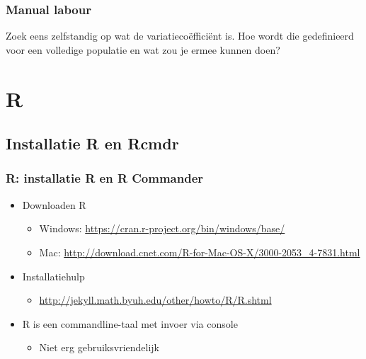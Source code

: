 \documentclass{beamer}
\newif\ifoplossing
\begin{document}
\begin{frame}
	\frametitle{Manual labour}
	Zoek eens zelfstandig op wat de variatieco\"effici\"ent is. Hoe
	wordt die gedefinieerd voor een volledige populatie en wat zou
	je ermee kunnen doen?
\end{frame}

\ifoplossing
	\begin{frame}
		De co\"effici\"nt van variatie is de standaard afwijking gedeeld door het gemiddelde.
		\[ c_{v} = \frac{\sigma}{\mu} \] 
		De variatiecoëfficiënt is dimensieloos en kan dus goed gebruikt worden om verschillende 
		populaties te vergelijken, zeker wanneer deze populaties sterk uiteenlopende gemiddelden hebben. 
		De variatiecoëfficiënt is in feite een maat voor relatieve spreiding: hij meet de mate van spreiding, 
		via de standaardafwijking, maar relatief ten opzichte van de gemiddelde ligging van de waarden.
	\end{frame}

\fi

\section{R}
\subsection{Installatie R en Rcmdr}

\begin{frame}
  \frametitle{R: installatie R en R Commander}
  \begin{itemize}
    \item Downloaden R
      \begin{itemize}
        \item Windows: \url{https://cran.r-project.org/bin/windows/base/}
        \item Mac: \url{http://download.cnet.com/R-for-Mac-OS-X/3000-2053_4-7831.html}
      \end{itemize}
    \item Installatiehulp
      \begin{itemize}
        \item \url{ http://jekyll.math.byuh.edu/other/howto/R/R.shtml}
      \end{itemize}
    \item R is een commandline-taal met invoer via console
      \begin{itemize}
        \item Niet erg gebruiksvriendelijk
      \end{itemize}
  \end{itemize}
\end{frame}
\end{document}
